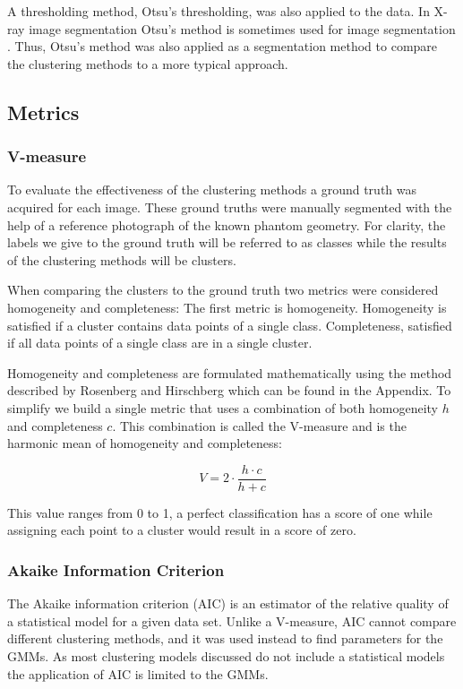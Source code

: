 \documentclass[a4paper,11pt]{article}
\begin{document}
A thresholding method, Otsu's thresholding, was also applied to the data. In X-ray image segmentation Otsu's method \cite{Otsu1979AHistograms} is sometimes used for image segmentation \cite{Sund2003AnImaging}. Thus, Otsu's method was also applied as a segmentation method to compare the clustering methods to a more typical approach.

\subsection{Metrics}
\subsubsection{V-measure}

To evaluate the effectiveness of the clustering methods a ground truth was acquired for each image. These ground truths were manually segmented with the help of a reference photograph of the known phantom geometry. For clarity, the labels we give to the ground truth will be referred to as classes while the results of the clustering methods will be clusters.

When comparing the clusters to the ground truth two metrics were considered homogeneity and completeness: The first metric is homogeneity. Homogeneity is satisfied if a cluster contains data points of a single class. Completeness, satisfied if all data points of a single class are in a single cluster. 

Homogeneity and completeness are formulated mathematically using the method described by Rosenberg and Hirschberg \cite{Rosenberg2007V-Measure:Measure} which can be found in the Appendix. To simplify we build a single metric that uses a combination of both homogeneity $h$ and completeness $c$. This combination is called the V-measure and is the harmonic mean of homogeneity and completeness:


\begin{equation}
V = 2 \cdot \frac{h \cdot c}{h + c}
\end{equation}

This value ranges from 0 to 1, a perfect classification has a score of one while assigning each point to a cluster would result in a score of zero.

\subsubsection{Akaike Information Criterion}

The Akaike information criterion (AIC) \cite{Akaike1998InformationPrinciple} is an estimator of the relative quality of a statistical model for a given data set. Unlike a V-measure, AIC cannot compare different clustering methods, and it was used instead to find parameters for the GMMs. As most clustering models discussed do not include a statistical models the application of AIC is limited to the GMMs.
\end{document}
